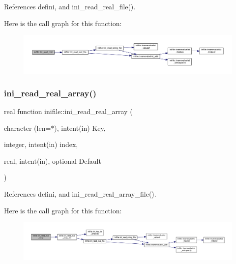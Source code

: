 References defini, and ini\+\_\+read\+\_\+real\+\_\+file().

Here is the call graph for this function\+:
\nopagebreak
\begin{figure}[H]
\begin{center}
\leavevmode
\includegraphics[width=350pt]{namespaceinifile_aa8c7c6b2bd003b849faacce75951fd64_cgraph}
\end{center}
\end{figure}
\mbox{\label{namespaceinifile_a9cc4d7fee9f1ff784999850b4d6f0b87}} 
\subsubsection{\texorpdfstring{ini\+\_\+read\+\_\+real\+\_\+array()}{ini\_read\_real\_array()}}
{\footnotesize\ttfamily real function inifile\+::ini\+\_\+read\+\_\+real\+\_\+array (\begin{DoxyParamCaption}\item[{character (len=$\ast$), intent(in)}]{Key,  }\item[{integer, intent(in)}]{index,  }\item[{real, intent(in), optional}]{Default }\end{DoxyParamCaption})}



References defini, and ini\+\_\+read\+\_\+real\+\_\+array\+\_\+file().

Here is the call graph for this function\+:
\nopagebreak
\begin{figure}[H]
\begin{center}
\leavevmode
\includegraphics[width=350pt]{namespaceinifile_a9cc4d7fee9f1ff784999850b4d6f0b87_cgraph}
\end{center}
\end{figure}
\mbox{\label{namespaceinifile_aec5d85c08e9381bc15b4dd5f9250a228}} 
